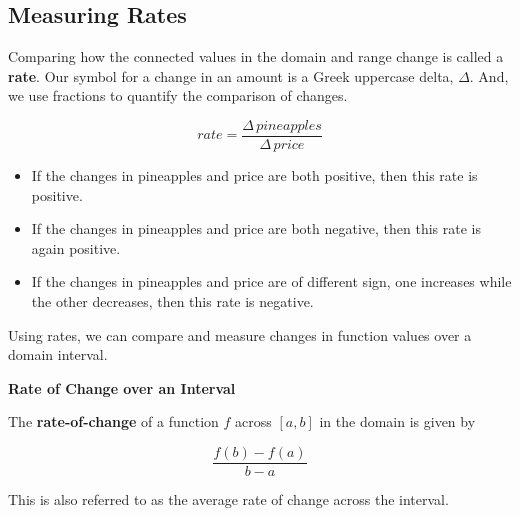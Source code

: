 \documentclass{ximera}
\begin{document}
\subsection*{Measuring Rates}

Comparing how the connected values in the domain and range change is called a \textbf{rate}. Our symbol for a change in an amount is a Greek uppercase delta, $\Delta$.  And, we use fractions to quantify the comparison of changes.

\[ rate = \frac{\Delta \, pineapples}{\Delta \, price}\]




\begin{itemize}
\item If the changes in pineapples and price are both positive, then this rate is positive.
\item If the changes in pineapples and price are both negative, then this rate is again positive.
\item If the changes in pineapples and price are of different sign, one increases while the other decreases, then this rate is negative.
\end{itemize}


Using rates, we can compare and measure changes in function values over a domain interval.


\begin{definition}  \textbf{\textcolor{green!50!black}{Rate of Change over an Interval}} 


The \textbf{rate-of-change} of a function $f$ across $[a, b]$ in the domain is given by

\[  \frac{f(b) - f(a)}{b - a}  \]



This is also referred to as the average rate of change across the interval.

\end{definition}
\end{document}
